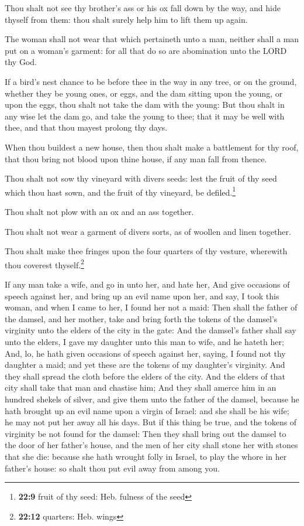  Thou shalt not see thy brother's ass or his ox fall down
by the way, and hide thyself from them: thou shalt surely help him to
lift them up again.

 The woman shall not wear that which pertaineth unto a
man, neither shall a man put on a woman's garment: for all that do so
are abomination unto the LORD thy God.

 If a bird's nest chance to be before thee in the way in
any tree, or on the ground, whether they be young ones, or eggs, and the
dam sitting upon the young, or upon the eggs, thou shalt not take the
dam with the young:  But thou shalt in any wise let the
dam go, and take the young to thee; that it may be well with thee, and
that thou mayest prolong thy days.

 When thou buildest a new house, then thou shalt make a
battlement for thy roof, that thou bring not blood upon thine house, if
any man fall from thence.

 Thou shalt not sow thy vineyard with divers seeds: lest
the fruit of thy seed which thou hast sown, and the fruit of thy
vineyard, be defiled.\footnote{\textbf{22:9} fruit of thy seed: Heb.
  fulness of the seed}

 Thou shalt not plow with an ox and an ass together.

 Thou shalt not wear a garment of divers sorts, as of
woollen and linen together.

 Thou shalt make thee fringes upon the four quarters of
thy vesture, wherewith thou coverest thyself.\footnote{\textbf{22:12}
  quarters: Heb. wings}

 If any man take a wife, and go in unto her, and hate
her,  And give occasions of speech against her, and bring
up an evil name upon her, and say, I took this woman, and when I came to
her, I found her not a maid:  Then shall the father of
the damsel, and her mother, take and bring forth the tokens of the
damsel's virginity unto the elders of the city in the gate:
 And the damsel's father shall say unto the elders, I
gave my daughter unto this man to wife, and he hateth her;
 And, lo, he hath given occasions of speech against her,
saying, I found not thy daughter a maid; and yet these are the tokens of
my daughter's virginity. And they shall spread the cloth before the
elders of the city.  And the elders of that city shall
take that man and chastise him;  And they shall amerce
him in an hundred shekels of silver, and give them unto the father of
the damsel, because he hath brought up an evil name upon a virgin of
Israel: and she shall be his wife; he may not put her away all his days.
 But if this thing be true, and the tokens of virginity
be not found for the damsel:  Then they shall bring out
the damsel to the door of her father's house, and the men of her city
shall stone her with stones that she die: because she hath wrought folly
in Israel, to play the whore in her father's house: so shalt thou put
evil away from among you.


